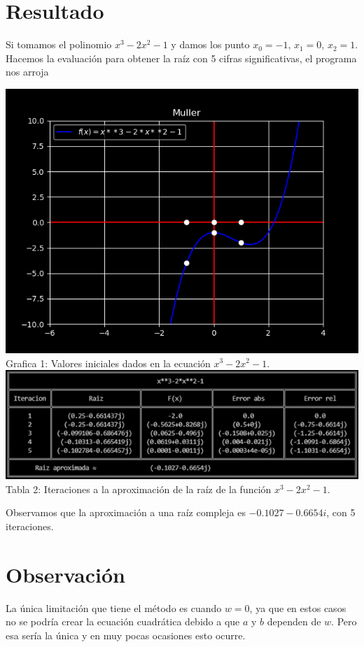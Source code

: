 \documentclass[12pt]{article}
\begin{document}
		\section*{\centering Resultado}\label{sec:Resultado}
			Si tomamos el polinomio $ x^3-2x^2-1 $ y damos los punto $ x_0 = -1,\,x_1 = 0,\,x_2 = 1 $. Hacemos 
			la evaluación para obtener la raíz con 5 cifras significativas, el programa nos arroja
			\begin{multicols}{2}
				\begin{center}
					\includegraphics[width=\linewidth]{Grafica 1.png}
					Grafica 1: Valores iniciales dados en la ecuación \columnbreak $ x^3-2x^2-1 $.\\
					\includegraphics[width=\linewidth]{Tabla 1.png}
					Tabla 2: Iteraciones a la aproximación de la raíz de la función $ x^3-2x^2-1 $.
				\end{center}
			\end{multicols}
			Observamos que la aproximación a una raíz compleja es $ -0.1027 - 0.6654i $, con 5 iteraciones.
		\section*{\centering Observación}\label{sec:Observacion}
			La única limitación que tiene el método es cuando $ w = 0 $, ya que en estos casos no se podría 
			crear la ecuación cuadrática debido a que $ a $ y $ b $ dependen de $ w $. Pero esa sería la única 
			y en muy pocas ocasiones esto ocurre.
\end{document}
